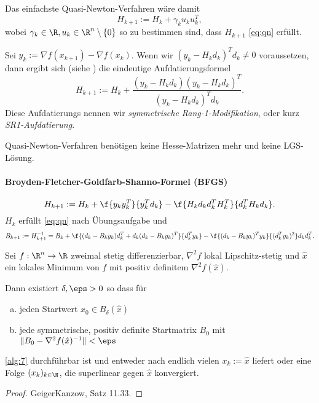 Das einfachste Quasi-Newton-Verfahren wäre damit
\[
	H_{k+1} := H_k + \gamma_k u_k u_k^T,
\]
wobei $\gamma_k \in \R, u_k \in \R^n \setminus \{0\}$ so zu bestimmen sind, dass $H_{k+1}$ \eqref{eq:qn} erfüllt.

Sei $y_k := \nabla f(x_{k+1}) - \nabla f(x_k)$.
Wenn wir $(y_k - H_k d_k)^T d_k \neq 0$ voraussetzen, dann ergibt sich (siehe ) die eindeutige Aufdatierungsformel
\[
	H_{k+1} := H_k + \dfrac{(y_k - H_k d_k)(y_k - H_k d_k)^T}{(y_k - H_k d_k)^T d_k}.
\]
Diese Aufdatierungs nennen wir \emph{symmetrische Rang-1-Modifikation}, oder kurz \emph{SR1-Aufdatierung}.



Quasi-Newton-Verfahren benötigen keine Hesse-Matrizen mehr und keine LGS-Lösung.

\paragraph{Broyden-Fletcher-Goldfarb-Shanno-Formel (BFGS)}

\[
	H_{k+1} := H_k + \f {y_ky_k^T}{y_k^T d_k} - \f {H_k d_k d_k^T H_k^T}{d_k^T H_k d_k}.
\]
$H_k$ erfüllt \ref{eq:qn} nach Übungsaufgabe %
und
\[
	B_{k+1} := H_{k+1}^{-1}
	= B_k + \f {(d_k-B_ky_k)d_k^T + d_k(d_k-B_ky_k)^T}{d_k^T y_k} - \f{(d_k-B_ky_k)^T y_k}{(d_k^T y_k)^2} d_k d_k^T.
\]

\begin{alg} \label{alg:7}
	\begin{algorithmic}
		\EndWhile
	\end{algorithmic}
\end{alg}

\begin{st} \label{2.56}
	Sei $f: \R^n \to \R$ zweimal stetig differenzierbar, $\nabla^2 f$ lokal Lipschitz-stetig und $\hat x$ ein lokales Minimum von $f$ mit positiv definitem $\nabla^2 f(\hat x)$.

	Dann existiert $\delta, \eps > 0$ so dass für
	\begin{enumerate}[(a)]
		\item
			jeden Startwert $x_0 \in B_\delta(\hat x)$
		\item
			jede symmetrische, positiv definite Startmatrix $B_0$ mit $\|B_0 - \nabla^2 f(\hat x)^{-1}\| < \eps$
	\end{enumerate}
	\ref{alg:7} durchführbar ist und entweder nach endlich vielen $x_k := \hat x$ liefert oder eine Folge $(x_k)_{k\in \N}$, die superlinear gegen $\hat x$ konvergiert.
	\begin{proof}
		GeigerKanzow, Satz 11.33.
	\end{proof}
\end{st}

